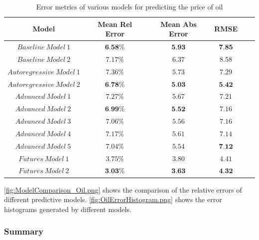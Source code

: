 \documentclass[runningheads]{llncs}
\begin{document}
\begin{table}
\begin{center}
\begin{tabular}{|c|c|c|c|c|c}
\hline
\textbf{Model} & \textbf{Mean Rel Error} & \textbf{Mean Abs Error} & \textbf{RMSE} \\ \hline \hline

$ Baseline\ Model\ 1 $ & $ \textbf{6.58\%} $ & $ \textbf{5.93} $ & $ \textbf{7.85} $ \\ \hline
$ Baseline\ Model\ 2 $ & $7.17\%$ & $6.37$ & $8.58$ \\ \hline\hline

$ Autoregressive\ Model\ 1 $ & $7.36\%$ & $5.73$ & $7.29$\\ \hline
$ Autoregressive\ Model\ 2 $ & $ \textbf{6.78\%} $ & $ \textbf{5.03}$ & $\textbf{5.42}$ \\ \hline\hline

$ Advanced\ Model\ 1\ $ & $7.27\%$ & $5.67$ & $7.21$ \\ \hline
$ Advanced\ Model\ 2\ $ & $ \textbf{6.99\%} $ & $ \textbf{5.52} $ & $7.16$ \\ \hline
$ Advanced\ Model\ 3\ $ & $7.06\%$ & $5.56$ & $7.16$ \\ \hline
$ Advanced\ Model\ 4\ $ & $7.17\%$ & $5.61$ & $7.14$ \\ \hline
$ Advanced\ Model\ 5\ $ & $7.04\%$ & $5.54$ & $ \textbf{7.12} $ \\ \hline\hline
$ Futures\ Model\ 1 $ & $3.75\%$ & $3.80$ & $4.41$ \\ \hline
$ Futures\ Model\ 2 $ & $ \textbf{3.03\%} $ & $\textbf{3.63}$ & $\textbf{4.32}$ \\ \hline
\end{tabular}
\end{center} 
\caption{Error metrics of various models for predicting the price of oil}
\end{table} 

\autoref{fig:ModelComparison_Oil.png} shows the comparison of the relative errors of different predictive models. \autoref{fig:OilErrorHistogram.png} shows the error histograms generated by different models.


\subsubsection{Summary}
\end{document}
